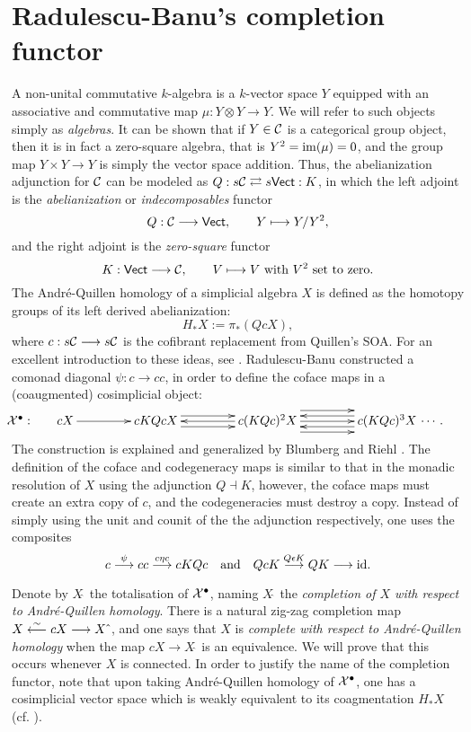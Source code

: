 \documentclass[11pt]{amsart}
\theoremstyle{plain}
\begin{document}
\section{Radulescu-Banu's completion functor}\label{introToRBwork}
A non-unital commutative $k$-algebra is a $k$-vector space $Y$ equipped with an associative and commutative map $\mu:Y\otimes Y\to Y$. We will refer to such objects simply as \emph{algebras}. It can be shown that if $Y\in\calC$ is a categorical group object, then it is in fact a zero-square algebra, that is  $Y^2=\im(\mu)=0$, and the group map $Y\times Y\to Y$ is simply the vector space addition. Thus, the abelianization adjunction for $\calC$ can be modeled as $Q:s\calC\rightleftarrows s\mathsf{Vect}:K$, in which the left adjoint is the \emph{abelianization} or \emph{indecomposables} functor
\[Q:\calC\to \mathsf{Vect},\qquad Y\mapsto Y/Y^2,\]
and the right adjoint is the \emph{zero-square} functor
\[K:\mathsf{Vect}\to\calC,\qquad V\mapsto V\textup{ with $V^2$ set to zero}.\]
The Andr\'e-Quillen homology of a simplicial algebra $X$ is defined as the homotopy groups of its left derived abelianization:
\[H_*X:=\pi_*(QcX),\]
where $c:s\calC\to s\calC$ is the cofibrant replacement from Quillen's SOA. For an excellent introduction to these ideas, see \cite[\S4]{MR1089001}. Radulescu-Banu constructed \cite{Radulescu-Banu.pdf} a comonad diagonal $\psi:c\to cc$, in order to define the coface maps in a (coaugmented) cosimplicial object:
\[\makebox[0cm][r]{\,$\calX^\bullet:\qquad $}\vcenter{
\def\labelstyle{\scriptstyle}
\xymatrix@C=1.5cm@1{
cX\,
\ar[r]
&
\,cKQcX\,
\ar[r];[]
&
\,c(KQc)^2X\,
\ar@<-1ex>[l];[]
\ar@<+1ex>[l];[]
\ar@<+1ex>[r];[]
\ar@<-1ex>[r];[]
&
\,c(KQc)^3X\,\makebox[0cm][l]{\,$\cdots. $}
\ar[l];[]
\ar@<-2ex>[l];[]
\ar@<+2ex>[l];[]
}}\]
The construction is explained and generalized by Blumberg and Riehl \cite{BlumRiehlResolutions.pdf}. The definition of the coface and codegeneracy maps is similar to that in the monadic resolution of $X$ using the adjunction $Q\dashv K$, however, the coface maps must create an extra copy of $c$, and the codegeneracies must destroy a copy.  Instead of simply using the unit and counit of the the adjunction respectively, one uses the composites
\[c\overset{\psi}{\to}cc\overset{c\eta c}{\to}cKQc\textup{\quad and\quad }QcK\overset{Q\epsilon K}{\to}QK\to \textup{id}.\]


Denote by $X\hat{\ }$ the totalisation of $\calX^\bullet$, naming $X\hat{\ }$ the \emph{completion of $X$ with respect to Andr\'e-Quillen homology}. There is a natural zig-zag completion map $X\overset{\sim}{\from} cX\to X\hat{\ }$, and one says that $X$ is \emph{complete with respect to Andr\'e-Quillen homology} when the map $cX\to X\hat{\ }$ is an equivalence. We will prove that this occurs whenever $X$ is connected. In order to justify the name of the completion functor, note that upon taking Andr\'e-Quillen homology of $\calX^\bullet$, one has a cosimplicial vector space which is weakly equivalent to its coagmentation $H_*X$ (cf. \cite{BlumRiehlResolutions.pdf}).
\end{document}
